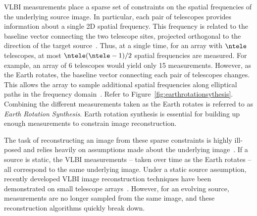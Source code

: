 VLBI measurements place a sparse set of constraints on
the %
spatial frequencies of the underlying source image. In particular, each pair of telescopes provides information about a single 2D spatial frequency. This frequency is related to the baseline vector connecting the two telescope sites, projected orthogonal to the direction of the target source~\cite{TMS}. Thus, at a single time, for an array with $\ntele$ telescopes, at most ${\ntele (\ntele - 1)}/{2}$ spatial frequencies are measured. 
For example, an array of 6 telescopes would yield only 15 measurements. 
However, as the Earth rotates, 
the baseline vector connecting each pair of telescopes changes. This allows the array to sample additional spatial frequencies along elliptical paths in the frequency domain~\cite{TMS}. Refer to Figure~\ref{fig:earthrotationsythesis}. Combining the different measurements taken as the Earth rotates is referred to as {\it Earth Rotation Synthesis}.
Earth rotation synthesis 
is essential for building up enough measurements to constrain image reconstruction.

The task of reconstructing an image from these sparse constraints is highly ill-posed and relies heavily on assumptions made about the underlying image~\cite{hogbom1974aperture, taylor1999synthesis, rusenimaging}. 
If a source is static, the VLBI measurements -- taken over time as the Earth rotates -- all correspond to the same underlying image. 
Under a static source assumption, 
recently developed VLBI image reconstruction techniques have been demonstrated on small telescope arrays~\cite{bouman2016computational, andrew, kazu, Fish_2016_Imaging, akiyama2017superresolution}.
However, for an evolving source, measurements are no longer sampled from the same image, and these reconstruction algorithms quickly break down. 



